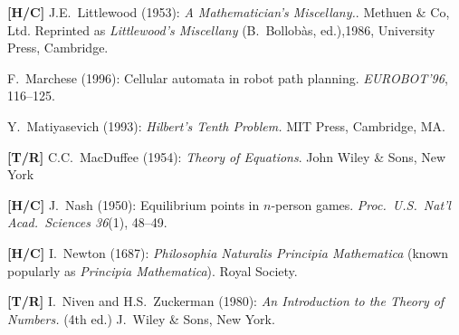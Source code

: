 \begin{thebibliography}{999}

{\bf [H/C]}
J.E.~Littlewood (1953):
{\it A Mathematician's Miscellany.}. Methuen \& Co, Ltd.
Reprinted as {\it Littlewood's Miscellany} (B.~Bollob\`{a}s, ed.),1986, University Press, Cambridge.




F.~Marchese (1996): Cellular automata in robot path planning.  {\it EUROBOT'96}, 116--125.

Y.~Matiyasevich (1993): {\it Hilbert's Tenth Problem.}  MIT Press, Cambridge, MA.

{\bf [T/R]}
C.C.~MacDuffee (1954): {\it Theory of Equations}.  John Wiley \& Sons, New York






{\bf [H/C]}
J.~Nash (1950): Equilibrium points in $n$-person games.  {\it Proc.~U.S.~Nat'l Acad.~Sciences 36}(1), 48--49.

{\bf [H/C]}
I.~Newton (1687): {\it Philosophia Naturalis Principia Mathematica} (known popularly as {\it Principia Mathematica}).  Royal Society.

{\bf [T/R]}
I.~Niven and H.S.~Zuckerman (1980): {\it An Introduction to the Theory of Numbers.} (4th ed.)
J.~Wiley \& Sons, New York.




\end{thebibliography}
